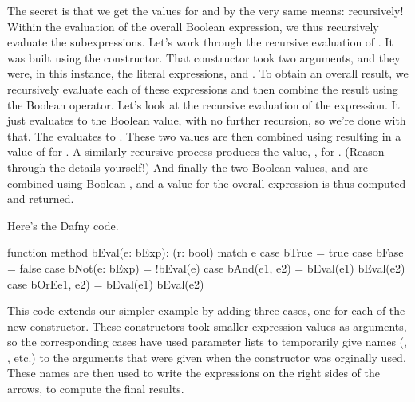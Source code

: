 \documentclass[letterpaper,10pt,english]{sphinxmanual}
\begin{document}
The secret is that we get the values for  and  by the very
same means: recursively! Within the evaluation of the overall Boolean
expression, we thus recursively evaluate the subexpressions. Let’s
work through the recursive evaluation of . It was built using the
 constructor. That constructor took two arguments, and they were,
in this instance, the literal expressions,  and . To
obtain an overall result, we recursively evaluate each of these
expressions and then combine the result using the Boolean 
operator. Let’s look at the recursive evaluation of the 
expression. It just evaluates to the Boolean value,  with no
further recursion, so we’re done with that. The  evaluates to
. These two values are then combined using  resulting in
a value of  for . A similarly recursive process produces
the value, , for . (Reason through the details yourself!)
And finally the two Boolean values,  and  are combined
using Boolean , and a value for the overall expression is thus
computed and returned.

Here’s the Dafny code.

\begin{sphinxVerbatim}[commandchars=\\\{\}]
function method bEval(e: bExp): (r: bool)
\PYGZob{}
    match e
    \PYGZob{}
        case bTrue =\PYGZgt{} true
        case bFase =\PYGZgt{} false
        case bNot(e: bExp) =\PYGZgt{} !bEval(e)
        case bAnd(e1, e2) =\PYGZgt{} bEval(e1) \PYGZam{}\PYGZam{} bEval(e2)
        case bOrEe1, e2) =\PYGZgt{}  bEval(e1) \textbar{}\textbar{} bEval(e2)
    \PYGZcb{}
\PYGZcb{}
\end{sphinxVerbatim}

This code extends our simpler example by adding three cases, one for
each of the new constructor. These constructors took smaller
expression values as arguments, so the corresponding cases have used
parameter lists to temporarily give names (, , etc.) to the
arguments that were given when the constructor was orginally used.
These names are then used to write the expressions on the right sides
of the arrows, to compute the final results.
\end{document}
